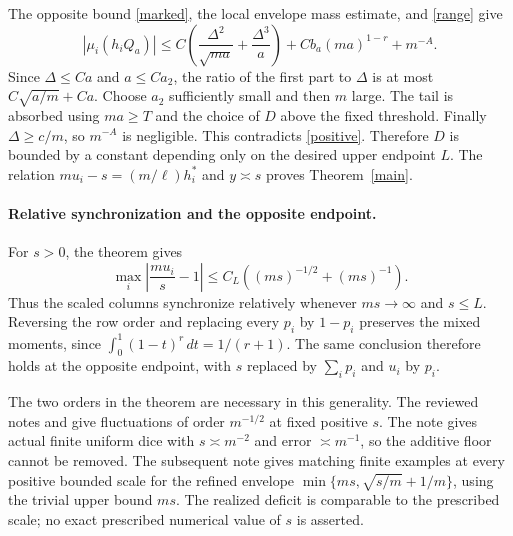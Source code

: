 \documentclass[11pt]{article}
\begin{document}
The opposite bound \eqref{marked}, the local envelope mass estimate,
and \eqref{range} give
\[
 |\mu_i(h_iQ_a)|
 \le C\left(\frac{\Delta^2}{\sqrt{ma}}+
                         \frac{\Delta^3}{a}\right)
       +C b_a(ma)^{1-r}+m^{-A}.
\]
Since $\Delta\le Ca$ and $a\le C a_2$, the ratio of the first part
to $\Delta$ is at most $C\sqrt{a/m}+Ca$.
Choose $a_2$ sufficiently small and then $m$ large. The tail is
absorbed using $ma\ge T$ and the choice of $D$ above the fixed
threshold. Finally $\Delta\ge c/m$, so $m^{-A}$ is negligible.
This contradicts \eqref{positive}. Therefore $D$ is bounded by a
constant depending only on the desired upper endpoint $L$.
The relation $m u_i-s=(m/\ell)h_i^*$ and $y\asymp s$ proves
Theorem~\ref{main}.
\paragraph{Relative synchronization and the opposite endpoint.}
For $s>0$, the theorem gives
\[
 \max_i\left|\frac{m u_i}{s}-1\right|
 \le C_L\left((ms)^{-1/2}+(ms)^{-1}\right).
\]
Thus the scaled columns synchronize relatively whenever $ms\to\infty$
and $s\le L$. Reversing the row order and replacing every $p_i$ by
$1-p_i$ preserves the mixed moments, since
$\int_0^1(1-t)^r\,dt=1/(r+1)$.
The same conclusion therefore holds at the opposite endpoint, with
$s$ replaced by $\sum_i p_i$ and $u_i$ by $p_i$.

The two orders in the theorem are necessary in this generality.
The reviewed notes 
and  give fluctuations of order
$m^{-1/2}$ at fixed positive $s$. The note
 gives actual finite uniform
dice with $s\asymp m^{-2}$ and error $\asymp m^{-1}$, so the additive
floor cannot be removed. The subsequent note
 gives matching finite examples
at every positive bounded scale for the refined envelope
$\min\{ms,\sqrt{s/m}+1/m\}$, using the trivial upper bound $ms$.
The realized deficit is comparable to the prescribed scale; no exact
prescribed numerical value of $s$ is asserted.
\end{document}

